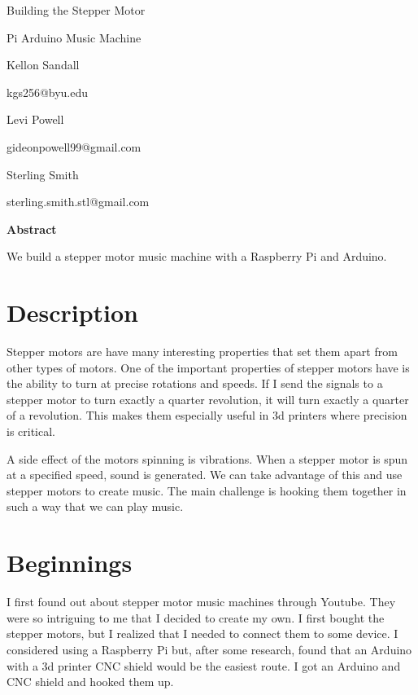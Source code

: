 \documentclass[12pt,letterpaper]{article}
\begin{document}
	
	\vspace*{2cm}
	
	\begin{center}
		\Large Building the Stepper Motor 
		
		Pi Arduino Music Machine
		
		\vspace{3cm}
		
		\large 
		Kellon Sandall
		
		kgs256@byu.edu
		
		\vspace{24pt}
		
		Levi Powell
		
		gideonpowell99@gmail.com
		
		\vspace{24pt}
		
		Sterling Smith
		
		sterling.smith.stl@gmail.com
	\end{center}
	
	
	\pagebreak
	
	\large \textbf{Abstract}
	
	\normalsize
	
	We build a stepper motor music machine with a Raspberry Pi and Arduino. 
	
	
	\section{Description}
	
	Stepper motors are have many interesting properties that set them apart from other types of motors. One of the important properties of stepper motors have is the ability to turn at precise rotations and speeds. If I send the signals to a stepper motor to turn exactly a quarter revolution, it will turn exactly a quarter of a revolution. This makes them especially useful in 3d printers where precision is critical. 
	
	A side effect of the motors spinning is vibrations. When a stepper motor is spun at a specified speed, sound is generated. We can take advantage of this and use stepper motors to create music. The main challenge is hooking them together in such a way that we can play music. 
	
	\section{Beginnings}
	
	I first found out about stepper motor music machines through Youtube. They were so intriguing to me that I decided to create my own. I first bought the stepper motors, but I realized that I needed to connect them to some device. I considered using a Raspberry Pi but, after some research, found that an Arduino with a 3d printer CNC shield would be the easiest route. I got an Arduino and CNC shield and hooked them up. 
	
\end{document}
